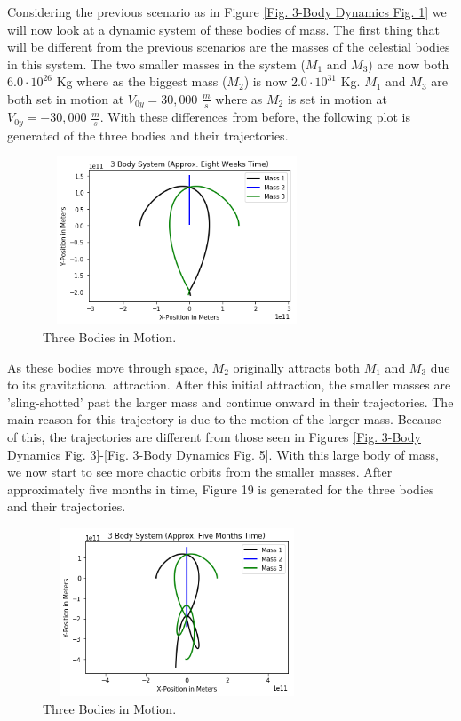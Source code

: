 \documentclass[twocolumn]{article}
\begin{document}
Considering the previous scenario as in Figure \ref{Fig. 3-Body Dynamics Fig. 1} we will now look at a dynamic system of these bodies of mass. The first thing that will be different from the previous scenarios are the masses of the celestial bodies in this system. The two smaller masses in the system ($M_1$ and $M_3$) are now both $6.0\cdot10^{26}$ Kg where as the biggest mass ($M_2$) is now $2.0\cdot10^{31}$ Kg. $M_1$ and $M_3$ are both set in motion at $V_{0y}=30,000$ $\frac{m}{s}$ where as $M_2$ is set in motion at $V_{0y}=-30,000$ $\frac{m}{s}$. With these differences from before, the following plot is generated of the three bodies and their trajectories.
\begin{figure}[ht]
    \centering
    \includegraphics[width=8cm, height=5cm]{Figures/3-Body Dynamics (6).png}
    \caption{\small{Three Bodies in Motion.}}
    \label{Fig. 3-Body Dynamics Fig. 6}
\end{figure}
\par \noindent
As these bodies move through space, $M_2$ originally attracts both $M_1$ and $M_3$ due to its gravitational attraction. After this initial attraction, the smaller masses are 'sling-shotted' past the larger mass and continue onward in their trajectories. The main reason for this trajectory is due to the motion of the larger mass. Because of this, the trajectories are different from those seen in Figures \ref{Fig. 3-Body Dynamics Fig. 3}-\ref{Fig. 3-Body Dynamics Fig. 5}. With this large body of mass, we now start to see more chaotic orbits from the smaller masses. After approximately five months in time, Figure 19 is generated for the three bodies and their trajectories.
\begin{figure}[ht]
    \centering
    \includegraphics[width=8cm, height=5cm]{Figures/3-Body Dynamics (7).png}
    \caption{\small{Three Bodies in Motion.}}
    \label{Fig. 3-Body Dynamics Fig. 7}
\end{figure}
\end{document}
